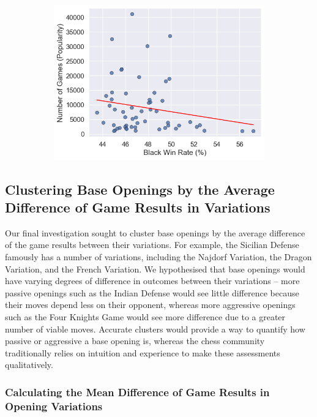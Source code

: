 \documentclass[a4paper, 11pt]{article}
\begin{document}
\begin{figure}[H]
\begin{subfigure}{0.49\textwidth}
        \includegraphics[width=\textwidth]{Popularity of Base Opening vs. Black Win Rate (Rated 1200-).png}
    \end{subfigure}
\end{figure}

\subsection{Clustering Base Openings by the Average Difference of Game Results in Variations}
Our final investigation sought to cluster base openings by the average difference of the game results between their variations. For example, the Sicilian Defense famously has a number of variations, including the Najdorf Variation, the Dragon Variation, and the French Variation. We hypothesised that base openings would have varying degrees of difference in outcomes between their variations -- more passive openings such as the Indian Defense would see little difference because their moves depend less on their opponent, whereas more aggressive openings such as the Four Knights Game would see more difference due to a greater number of viable moves. Accurate clusters would provide a way to quantify how passive or aggressive a base opening is, whereas the chess community traditionally relies on intuition and experience to make these assessments qualitatively.

\subsubsection{Calculating the Mean Difference of Game Results in Opening Variations}
\end{document}
